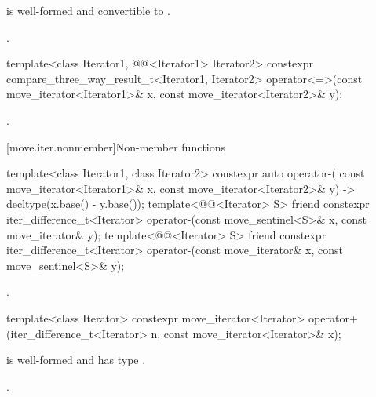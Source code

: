 \begin{itemdescr}
\pnum
\constraints
{} is well-formed and
convertible to .

\pnum
\returns
{}.
\end{itemdescr}

%
\begin{itemdecl}
template<class Iterator1, @@<Iterator1> Iterator2>
  constexpr compare_three_way_result_t<Iterator1, Iterator2>
    operator<=>(const move_iterator<Iterator1>& x,
                const move_iterator<Iterator2>& y);
\end{itemdecl}

\begin{itemdescr}
\pnum
\returns
{}.
\end{itemdescr}

[move.iter.nonmember]{Non-member functions}

%
\begin{itemdecl}
template<class Iterator1, class Iterator2>
  constexpr auto operator-(
    const move_iterator<Iterator1>& x, const move_iterator<Iterator2>& y)
      -> decltype(x.base() - y.base());
template<@@<Iterator> S>
  friend constexpr iter_difference_t<Iterator>
    operator-(const move_sentinel<S>& x, const move_iterator& y);
template<@@<Iterator> S>
  friend constexpr iter_difference_t<Iterator>
    operator-(const move_iterator& x, const move_sentinel<S>& y);
\end{itemdecl}

\begin{itemdescr}
\pnum
\returns
{}.
\end{itemdescr}

%
\begin{itemdecl}
template<class Iterator>
  constexpr move_iterator<Iterator>
    operator+(iter_difference_t<Iterator> n, const move_iterator<Iterator>& x);
\end{itemdecl}

\begin{itemdescr}
\pnum
\constraints
{} is well-formed and has type .

\pnum
\returns
{}.
\end{itemdescr}

